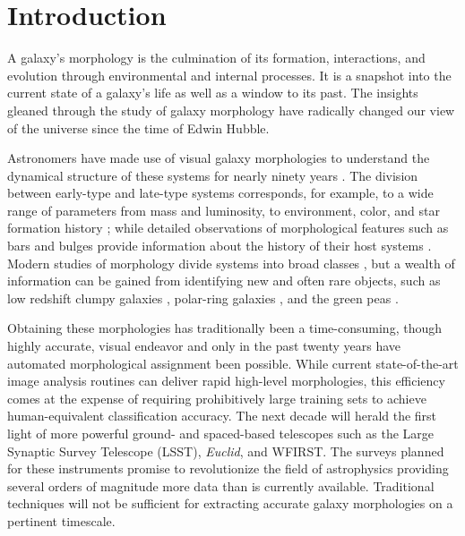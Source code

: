 
\chapter{Introduction}
\label{chap:intro}


A galaxy's morphology is the culmination of its formation, interactions, and evolution through environmental and internal processes. It is a snapshot into the current state of a galaxy's life as well as a window to its past. The insights gleaned through the study of galaxy morphology have radically changed our view of the universe since the time of Edwin Hubble. 


Astronomers have made use of visual galaxy morphologies to understand the dynamical structure of these systems for nearly ninety years 
\citep[e.g.,][]{Hubble1936, 
			deVaucouleurs1959,
			Sandage1961, 
			vandenBergh1976, 
			NairAbraham2010, 
			Baillard2011}. 
The division between early-type and late-type systems corresponds, for example, to a wide range of parameters from mass and luminosity, to environment, color, and star formation history 
\citep[e.g.,][]{Kormendy1977,  
			Dressler1980, 
			Strateva2001, 
			Blanton2003a, 
			Kauffman2003, 
			Nakamura2003, 
			Shen2003, 
			Peng2010}; 
while detailed observations of morphological features such as bars and bulges provide information about the history of their host systems 
\citep[e.g.,][]{KK04, 
			Elmegreen2008, 
			Sheth2008, 
			Masters2010, 
			Simmons2014}. 
Modern studies of morphology  divide systems into broad classes 
\citep[e.g.,][]{Conselice2006, 
			Lintott2008, 
			Kartaltepe2015, 
			Peth2016}, 
but a wealth of information can be gained from identifying new and often rare objects, such as low redshift clumpy galaxies \citep[e.g.,][]{Elmegreen2013}, polar-ring galaxies \citep[e.g.,][]{Whitmore1990}, and the green peas \citep{Cardamone2009}. 

Obtaining these morphologies has traditionally been a time-consuming, though highly accurate, visual endeavor and only in the past twenty years have automated morphological assignment been possible. While current state-of-the-art image analysis routines can deliver rapid high-level morphologies, this efficiency comes at the expense of requiring prohibitively large training sets to achieve human-equivalent classification accuracy.  The next decade will herald the first light of more powerful ground- and spaced-based telescopes such as the Large Synaptic Survey Telescope (LSST), \textit{Euclid}, and WFIRST. The surveys planned for these instruments promise to revolutionize the field of astrophysics providing several orders of magnitude more data than is currently available. Traditional techniques will not be sufficient for extracting accurate galaxy morphologies on a pertinent timescale. 

